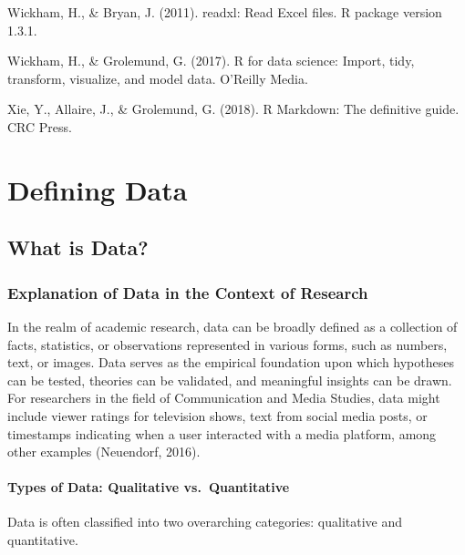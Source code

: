 \documentclass[
  b5paper]{book}
\begin{document}
Wickham, H., \& Bryan, J. (2011). readxl: Read Excel files. R package version 1.3.1.

Wickham, H., \& Grolemund, G. (2017). R for data science: Import, tidy, transform, visualize, and model data. O'Reilly Media.

Xie, Y., Allaire, J., \& Grolemund, G. (2018). R Markdown: The definitive guide. CRC Press.

\hypertarget{defining-data}{%
\chapter{Defining Data}\label{defining-data}}

\hypertarget{what-is-data}{%
\section{What is Data?}\label{what-is-data}}

\hypertarget{explanation-of-data-in-the-context-of-research}{%
\subsection{Explanation of Data in the Context of Research}\label{explanation-of-data-in-the-context-of-research}}

In the realm of academic research, data can be broadly defined as a collection of facts, statistics, or observations represented in various forms, such as numbers, text, or images. Data serves as the empirical foundation upon which hypotheses can be tested, theories can be validated, and meaningful insights can be drawn. For researchers in the field of Communication and Media Studies, data might include viewer ratings for television shows, text from social media posts, or timestamps indicating when a user interacted with a media platform, among other examples (Neuendorf, 2016).

\hypertarget{types-of-data-qualitative-vs.-quantitative}{%
\subsubsection{Types of Data: Qualitative vs.~Quantitative}\label{types-of-data-qualitative-vs.-quantitative}}

Data is often classified into two overarching categories: qualitative and quantitative.
\end{document}
